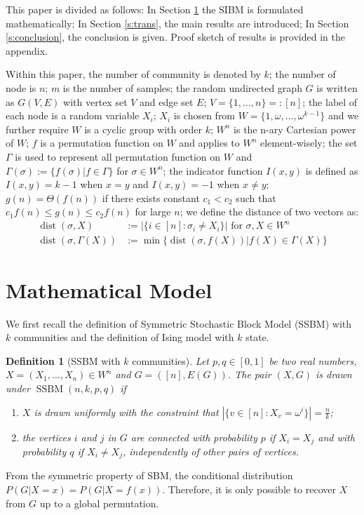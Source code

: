 \documentclass[conference]{IEEEtran}
\newtheorem{definition}{Definition}%
\DeclareMathOperator{\SSBM}{SSBM}
\DeclareMathOperator{\dist}{dist}
\begin{document}
This paper is divided as follows: In Section \ref{s:Preliminaries} the SIBM is formulated mathematically;
In Section \ref{s:trans}, the main results are introduced;
In Section \ref{s:conclusion}, the conclusion is given. Proof sketch of results is provided in the appendix.

Within this paper, the number of community is denoted by $k$; the number of node is $n$; $m$ is the number of samples; the random undirected graph $G$ is written as $G(V,E)$ with vertex set $V$ and edge set $E$;
$V=\{1,\dots, n\} =: [n]$;
the label of each node is a random variable $X_i$; $X_i$ is chosen from $W= \{1, \omega, \dots, \omega^{k-1}\}$ and we further require $W$
is a cyclic group with order $k$; $W^n$ is the n-ary Cartesian power of $W$; $f$ is a permutation function on $W$ and applies to $W^n$ element-wisely; the set $\Gamma$ is used to represent all permutation function on $W$ and $\Gamma(\sigma):=\{f(\sigma)| f\in \Gamma\}$ for $\sigma \in W^n$; the indicator function $I(x, y)$ is defined as
$I(x, y) = k-1 $ when $x=y$ and $I(x,y)=-1$ when $x\neq y$; $g(n) = \Theta(f(n))$ if there exists constant $c_1 < c_2$ such that $c_1 f(n) \leq g(n) \leq c_2 f(n)$
for large $n$;
we define the distance of two vectors as:
\begin{align*}
\dist(\sigma, X)
&:=|\{i\in[n]:\sigma_i\neq X_i\}| \textrm{ for } \sigma,X\in W^n \\
\dist(\sigma,\Gamma(X))
&:=\min\{\dist(\sigma, f(X)) | f(X) \in \Gamma(X)\}
\end{align*}

\section{Mathematical Model} \label{s:Preliminaries}
We first recall the definition of Symmetric Stochastic Block Model (SSBM) with $k$ communities \cite{Abbe17} and the definition of Ising model with $k$ state.
\begin{definition}[SSBM with $k$ communities] \label{def:SSBM}
Let $p,q\in[0,1]$ be two real numbers, $X=(X_1,\dots,X_n)\in W^n$ and $G=([n],E(G))$. The pair $(X,G)$ is drawn under $\SSBM(n,k,p,q)$ if 
\begin{enumerate}
\item $X$ is drawn uniformly with the constraint that $|\{v \in [n] : X_v = \omega^i\}| = \frac{n}{k}$;

\item the vertices $i$ and $j$ in $G$ are connected with probability $p$ if $X_i=X_j$ and with probability $q$ if $X_i \neq X_j$, independently of other pairs of vertices.
\end{enumerate}
\end{definition}
From the symmetric property of SBM, the conditional distribution $P(G|X=x) = P(G|X=f(x))$. Therefore, it is only possible to recover $X$ from $G$ up to a global permutation.
\end{document}
